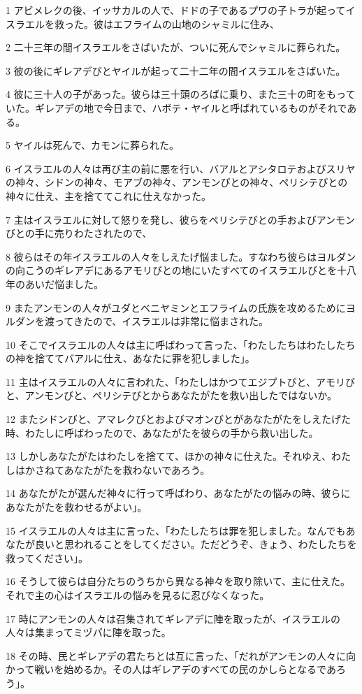\par 1 アビメレクの後、イッサカルの人で、ドドの子であるプワの子トラが起ってイスラエルを救った。彼はエフライムの山地のシャミルに住み、
\par 2 二十三年の間イスラエルをさばいたが、ついに死んでシャミルに葬られた。
\par 3 彼の後にギレアデびとヤイルが起って二十二年の間イスラエルをさばいた。
\par 4 彼に三十人の子があった。彼らは三十頭のろばに乗り、また三十の町をもっていた。ギレアデの地で今日まで、ハボテ・ヤイルと呼ばれているものがそれである。
\par 5 ヤイルは死んで、カモンに葬られた。
\par 6 イスラエルの人々は再び主の前に悪を行い、バアルとアシタロテおよびスリヤの神々、シドンの神々、モアブの神々、アンモンびとの神々、ペリシテびとの神々に仕え、主を捨ててこれに仕えなかった。
\par 7 主はイスラエルに対して怒りを発し、彼らをペリシテびとの手およびアンモンびとの手に売りわたされたので、
\par 8 彼らはその年イスラエルの人々をしえたげ悩ました。すなわち彼らはヨルダンの向こうのギレアデにあるアモリびとの地にいたすべてのイスラエルびとを十八年のあいだ悩ました。
\par 9 またアンモンの人々がユダとベニヤミンとエフライムの氏族を攻めるためにヨルダンを渡ってきたので、イスラエルは非常に悩まされた。
\par 10 そこでイスラエルの人々は主に呼ばわって言った、「わたしたちはわたしたちの神を捨ててバアルに仕え、あなたに罪を犯しました」。
\par 11 主はイスラエルの人々に言われた、「わたしはかつてエジプトびと、アモリびと、アンモンびと、ペリシテびとからあなたがたを救い出したではないか。
\par 12 またシドンびと、アマレクびとおよびマオンびとがあなたがたをしえたげた時、わたしに呼ばわったので、あなたがたを彼らの手から救い出した。
\par 13 しかしあなたがたはわたしを捨てて、ほかの神々に仕えた。それゆえ、わたしはかさねてあなたがたを救わないであろう。
\par 14 あなたがたが選んだ神々に行って呼ばわり、あなたがたの悩みの時、彼らにあなたがたを救わせるがよい」。
\par 15 イスラエルの人々は主に言った、「わたしたちは罪を犯しました。なんでもあなたが良いと思われることをしてください。ただどうぞ、きょう、わたしたちを救ってください」。
\par 16 そうして彼らは自分たちのうちから異なる神々を取り除いて、主に仕えた。それで主の心はイスラエルの悩みを見るに忍びなくなった。
\par 17 時にアンモンの人々は召集されてギレアデに陣を取ったが、イスラエルの人々は集まってミヅパに陣を取った。
\par 18 その時、民とギレアデの君たちとは互に言った、「だれがアンモンの人々に向かって戦いを始めるか。その人はギレアデのすべての民のかしらとなるであろう」。


